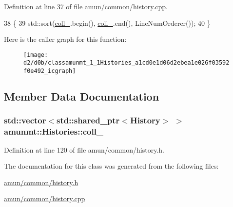 Definition at line 37 of file amun/common/history.\+cpp.


\begin{DoxyCode}
38 \{
39   std::sort(\hyperlink{classamunmt_1_1Histories_a7e7986695d324bd0dcf5186633667b09}{coll\_}.begin(), \hyperlink{classamunmt_1_1Histories_a7e7986695d324bd0dcf5186633667b09}{coll\_}.end(), LineNumOrderer());
40 \}
\end{DoxyCode}


Here is the caller graph for this function\+:
\nopagebreak
\begin{figure}[H]
\begin{center}
\leavevmode
\texttt{[image: d2/d0b/classamunmt\_1\_1Histories\_a1cd0e1d06d2ebea1e026f03592f0e492\_icgraph]}
\end{center}
\end{figure}




\subsection{Member Data Documentation}
\subsubsection[{\texorpdfstring{coll\+\_\+}{coll_}}]{\setlength{\rightskip}{0pt plus 5cm}std\+::vector$<$std\+::shared\+\_\+ptr$<${\bf History}$>$ $>$ amunmt\+::\+Histories\+::coll\+\_\+\hspace{0.3cm}{\ttfamily [protected]}}\hypertarget{classamunmt_1_1Histories_a7e7986695d324bd0dcf5186633667b09}{}\label{classamunmt_1_1Histories_a7e7986695d324bd0dcf5186633667b09}


Definition at line 120 of file amun/common/history.\+h.



The documentation for this class was generated from the following files\+:\begin{DoxyCompactItemize}
\item 
\hyperlink{amun_2common_2history_8h}{amun/common/history.\+h}\item 
\hyperlink{amun_2common_2history_8cpp}{amun/common/history.\+cpp}\end{DoxyCompactItemize}
